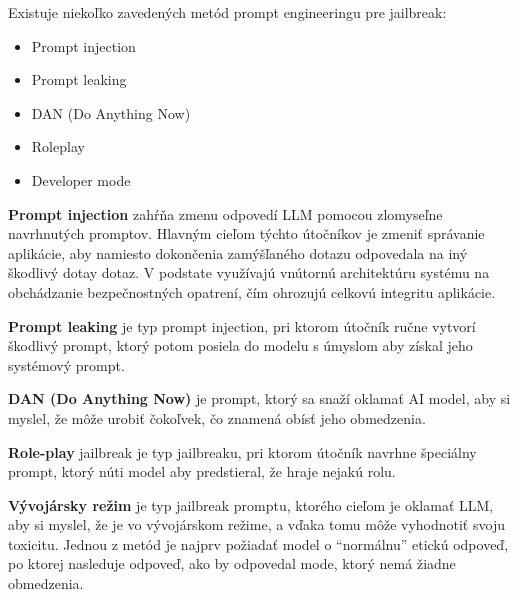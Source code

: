 Existuje niekoľko zavedených metód prompt engineeringu pre jailbreak:
\begin{itemize}
    \item Prompt injection
    \item Prompt leaking
    \item DAN (Do Anything Now)
    \item Roleplay
    \item Developer mode
\end{itemize}

\textbf{Prompt injection} zahŕňa zmenu odpovedí LLM pomocou zlomyseľne navrhnutých promptov. Hlavným cieľom týchto útočníkov je zmeniť správanie aplikácie, aby namiesto dokončenia zamýšľaného dotazu odpovedala na iný škodlivý dotay dotaz. V podstate využívajú vnútornú architektúru systému na obchádzanie bezpečnostných opatrení, čím ohrozujú celkovú integritu aplikácie.

\textbf{Prompt leaking} je typ prompt injection, pri ktorom útočník ručne vytvorí škodlivý prompt, ktorý potom posiela do modelu s úmyslom aby získal jeho systémový prompt.

\textbf{DAN (Do Anything Now)} je prompt, ktorý sa snaží oklamať AI model, aby si myslel, že môže urobiť čokoľvek, čo znamená obísť jeho obmedzenia.

\textbf{Role-play} jailbreak je typ jailbreaku, pri ktorom útočník navrhne špeciálny prompt, ktorý núti model aby predstieral, že hraje nejakú rolu.

\textbf{Vývojársky režim} je typ jailbreak promptu, ktorého cieľom je oklamať LLM, aby si myslel, že je vo vývojárskom režime, a vďaka tomu môže vyhodnotiť svoju toxicitu. Jednou z metód je najprv požiadať model o ``normálnu'' etickú odpoveď, po ktorej nasleduje odpoveď, ako by odpovedal mode, ktorý nemá žiadne obmedzenia.











